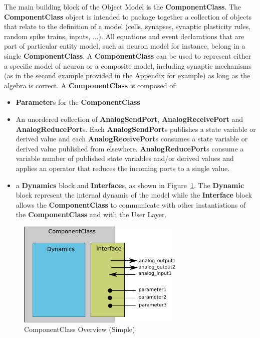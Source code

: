 \documentclass{article}
\newcommand{\nmlClass}[1]{{\bf #1}}
\newcommand{\ComponentClass}{{\bf{ComponentClass}}\xspace}
\newcommand{\Dynamics}{{\bf{Dynamics}}\xspace}
\newcommand{\Dynamic}{{\bf{Dynamic}}\xspace}
\newcommand{\Interface}{{\bf{Interface}}\xspace}
\newcommand{\Interfaces}{{\bf{Interface}}s\xspace}
\begin{document}
The main building block of the Object Model is the \ComponentClass.
The \ComponentClass object is intended to package together a collection of
objects that relate to the definition of a model (cells, synapses, synaptic
plasticity rules, random spike trains, inputs, ...).
All equations and event declarations that are part of particular entity
model, such as neuron model for instance, belong in a single \ComponentClass.
A \ComponentClass can be used to represent either a specific model of neuron or a
composite model, including synaptic mechanisms (as in the second example
provided in the Appendix for example) as long as the algebra is correct.
A \ComponentClass is composed of:
\begin{itemize}
\item \nmlClass{Parameter}s for the \nmlClass{ComponentClass}
\item An unordered collection of \nmlClass{AnalogSendPort}, \nmlClass{AnalogReceivePort} and \nmlClass{AnalogReducePort}s. Each \nmlClass{AnalogSendPort}s publishes a state variable or derived value and each \nmlClass{AnalogReceivePort}s consumes a state variable or derived value published from elsewhere. \nmlClass{AnalogReducePort}s consume a variable number of published state variables and/or derived values and applies an operator that reduces the incoming ports to a single value.
\item  a \Dynamics block and \Interfaces, as shown
in Figure~\ref{fig:EX1_RegimeGraph}. The \Dynamic block represent the internal
dynamic of the model while the \Interface block allows the \ComponentClass to
communicate with other instantiations of the \ComponentClass and with the User
Layer.
\end{itemize}

\begin{figure}[htb!]
\center
\includegraphics[width=8cm]{figures/component_simple.pdf}
\protect\caption{ComponentClass Overview (Simple)}
\label{fig:EX1_RegimeGraph}
\end{figure}
\end{document}
